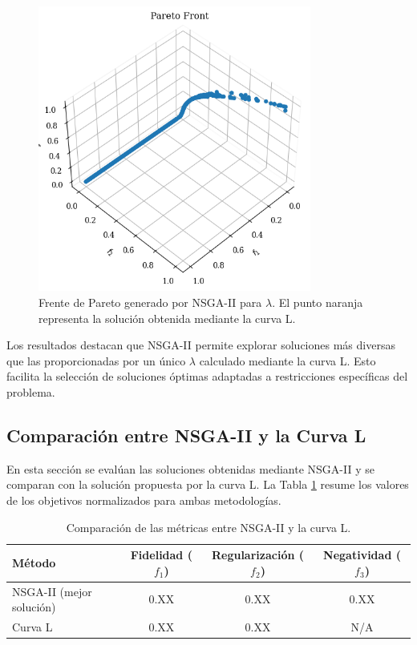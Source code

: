 \begin{figure}[h]
    \centering
    \includegraphics[width=0.8\textwidth]{pareto_front_single_value.png}
    \caption{Frente de Pareto generado por NSGA-II para \( \lambda \). El punto naranja representa la solución obtenida mediante la curva L.}
    \label{fig:pareto_front}
\end{figure}

Los resultados destacan que NSGA-II permite explorar soluciones más diversas que las proporcionadas por un único \( \lambda \) calculado mediante la curva L. Esto facilita la selección de soluciones óptimas adaptadas a restricciones específicas del problema.

\subsection{Comparación entre NSGA-II y la Curva L} \label{sec:results:comparison}

En esta sección se evalúan las soluciones obtenidas mediante NSGA-II y se comparan con la solución propuesta por la curva L. La Tabla \ref{tab:comparison} resume los valores de los objetivos normalizados para ambas metodologías.

\begin{table}[h]
    \centering
    \begin{tabular}{lccc}
        \toprule
        Método & Fidelidad (\( f_1 \)) & Regularización (\( f_2 \)) & Negatividad (\( f_3 \)) \\
        \midrule
        NSGA-II (mejor solución) & 0.XX & 0.XX & 0.XX \\
        Curva L & 0.XX & 0.XX & N/A \\
        \bottomrule
    \end{tabular}
    \caption{Comparación de las métricas entre NSGA-II y la curva L.}
    \label{tab:comparison}
\end{table}

